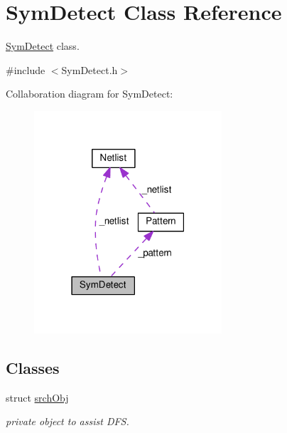 \hypertarget{classSymDetect}{}\section{Sym\+Detect Class Reference}
\label{classSymDetect}


\hyperlink{classSymDetect}{Sym\+Detect} class.  




{\ttfamily \#include $<$Sym\+Detect.\+h$>$}



Collaboration diagram for Sym\+Detect\+:\nopagebreak
\begin{figure}[H]
\begin{center}
\leavevmode
\includegraphics[width=198pt]{classSymDetect__coll__graph}
\end{center}
\end{figure}
\subsection*{Classes}
\begin{DoxyCompactItemize}
\item 
struct \hyperlink{structSymDetect_1_1srchObj}{srch\+Obj}
\begin{DoxyCompactList}\small\item\em private object to assist D\+FS. \end{DoxyCompactList}\end{DoxyCompactItemize}
